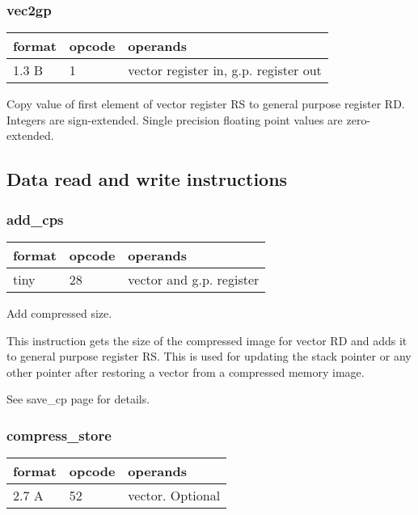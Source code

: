 \documentclass[forwardcom.tex]{subfiles}
\begin{document}
\subsubsection{vec2gp}
\label{table:vec2gpInstruction}
\begin{tabular}{|p{12mm}|p{12mm}|p{110mm}|}
\hline
\bfseries format & \bfseries opcode & \bfseries operands \\ \hline
1.3 B & 1 & vector register in, g.p. register out \\ \hline
\end{tabular}
\vspace{2mm}

Copy value of first element of vector register RS to general purpose register RD. Integers are sign-extended. Single precision floating point values are zero-extended.

\vspace{2mm}
\subsection{Data read and write instructions}

\subsubsection{add\_cps}
\label{table:addCpsInstruction}
\begin{tabular}{|p{12mm}|p{12mm}|p{110mm}|}
\hline
\bfseries format & \bfseries opcode & \bfseries operands \\ \hline
tiny & 28 & vector and g.p. register \\ \hline
\end{tabular}
\vspace{2mm}

Add compressed size.
\vspace{2mm}

This instruction gets the size of the compressed image for vector RD and adds it to general purpose register RS.
This is used for updating the stack pointer or any other pointer
after restoring a vector from a compressed memory image.
\vspace{2mm}

See save\_cp page \pageref{table:saveCpInstruction} for details.

\subsubsection{compress\_store}
\label{table:compressStoreInstruction}
\begin{tabular}{|p{12mm}|p{12mm}|p{110mm}|}
\hline
\bfseries format & \bfseries opcode & \bfseries operands \\ \hline
2.7 A & 52 & vector. Optional \\ \hline
\end{tabular}
\vspace{2mm}
\end{document}
